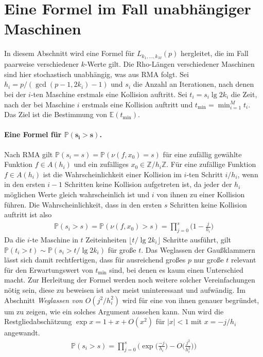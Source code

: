 \documentclass[a4paper, 10pt, ngerman]{article}
\newcommand{\E}{\mathbb{E}}
\newcommand{\Z}{\mathbb{Z}}
\renewcommand{\P}{\mathbb{P}}
\begin{document}
\section{Eine Formel im Fall unabhängiger Maschinen}

In diesem Abschnitt wird eine Formel für $L_{k_1, \dots, k_M}(p)$ hergleitet, die im Fall paarweise verschiedener $k$-Werte gilt. Die Rho-Längen verschiedener Maschinen sind hier stochastisch unabhängig, was aus RMA folgt. Sei $h_i = p/(\gcd(p - 1, 2k_i) - 1)$ und $s_i$ die Anzahl an Iterationen, nach denen bei der $i$-ten Maschine erstmals eine Kollision auftritt. Sei $t_i = s_i \lg 2k_i$ die Zeit, nach der bei Maschine $i$ erstmals eine Kollision auftritt und $t_{\min} = \min_{i = 1}^M t_i$. Das Ziel ist die Bestimmung von $\E(t_{\min})$.

\paragraph{Eine Formel für $\bm{\P(s_i > s)}$.} Nach RMA gilt $\P(s_i = s) = \P(\nu(f, x_0) = s)$ für eine zufällig gewählte Funktion $f \in A(h_i)$ und ein zufälliges $x_0 \in \Z/h_i\Z$. Für eine zufällige Funktion $f \in A(h_i)$ ist die Wahrscheinlichkeit einer Kollision im $i$-ten Schritt $i/h_i$, wenn in den ersten $i-1$ Schritten keine Kollision aufgetreten ist, da jeder der $h_i$ möglichen Werte gleich wahrscheinlich ist und $i$ von ihnen zu einer Kollision führen. Die Wahrscheinlichkeit, dass in den ersten $s$ Schritten keine Kollision auftritt ist also
\begin{align*}
    \P(s_i > s)
    = \P(\nu(f, x_0) > s)
    = \prod_{j = 0}^s \bigg (1 - \frac {j} {h_i} \bigg )
\end{align*}
Da die $i$-te Maschine in $t$ Zeiteinheiten $\lfloor t / \lg 2k_i \rfloor$ Schritte ausführt, gilt $\P(t_i > t) \sim \P(s_i > t / \lg 2k_i)$ für große $t$. Das Weglassen der Gaußklammern lässt sich damit rechtfertigen, dass für ausreichend großes $p$ nur große $t$ relevant für den Erwartungswert von $t_{\min}$ sind, bei denen es kaum einen Unterschied macht. Zur Herleitung der Formel werden noch weitere solcher Vereinfachungen nötig sein, diese zu beweisen ist aber meist uninteressant und aufwändig. Im Abschnitt \emph{Weglassen von $O(j^2/h_i^2)$} wird für eine von ihnen genauer begründet, um zu zeigen, wie ein solches Argument aussehen kann. Nun wird die Restgliedabschätzung $\exp x = 1 + x + O(x^2)$ für $|x| < 1$ mit $x = -j/h_i$ angewandt.
\begin{align*}
    \P(s_i > s)
    = \prod_{j = 0}^{s} \Bigg ( \exp \bigg ( \frac {-j}{h_i} \bigg )
    - O \bigg ( \frac {j^2} {h_i^2} \bigg ) \Bigg )
\end{align*}
\end{document}
